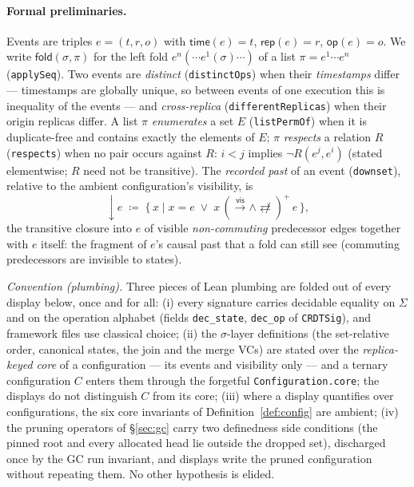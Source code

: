 \documentclass[11pt]{article}
\newcommand{\vis}{\xrightarrow{\mathsf{vis}}}
\newcommand{\ncomm}{\not\rightleftarrows}
\newcommand{\dow}[1]{{\downarrow}#1}
\newcommand{\lean}[1]{\texttt{#1}}
\newcommand{\fold}{\mathsf{fold}}
\begin{document}
\paragraph{Formal preliminaries.} Events are triples $e = (t,r,o)$ with
$\mathsf{time}(e) = t$, $\mathsf{rep}(e) = r$, $\mathsf{op}(e) = o$. We
write $\fold(\sigma, \pi)$ for the left fold
$e^n(\cdots e^1(\sigma)\cdots)$ of a list $\pi = e^1 \cdots e^n$
(\lean{applySeq}). Two events are \emph{distinct}
(\lean{distinctOps}) when their \emph{timestamps} differ --- timestamps
are globally unique, so between events of one execution this is
inequality of the events --- and \emph{cross-replica}
(\lean{differentReplicas}) when their origin replicas differ. A list
$\pi$ \emph{enumerates} a set $E$ (\lean{listPermOf}) when it is
duplicate-free and contains exactly the elements of $E$; $\pi$
\emph{respects} a relation $R$ (\lean{respects}) when no pair occurs
against $R$: $i < j$ implies $\neg R(e^j, e^i)$ (stated elementwise;
$R$ need not be transitive). The \emph{recorded past} of an event
(\lean{downset}), relative to the ambient configuration's visibility,
is
\[
  \dow{e} \;\coloneqq\;
  \{\, x \mid x = e \;\vee\; x \,({\vis} \wedge {\ncomm})^{+}\, e \,\},
\]
the transitive closure into $e$ of visible \emph{non-commuting}
predecessor edges together with $e$ itself: the fragment of $e$'s causal
past that a fold can still see (commuting predecessors are invisible to
states).

\emph{Convention (plumbing).} Three pieces of Lean plumbing are folded
out of every display below, once and for all: (i) every signature
carries decidable equality on $\Sigma$ and on the operation alphabet
(fields \lean{dec\_state}, \lean{dec\_op} of \lean{CRDTSig}), and
framework files use classical choice; (ii) the $\sigma$-layer
definitions (the set-relative order, canonical states, the join and the
merge VCs) are stated over the \emph{replica-keyed core} of a
configuration --- its events and visibility only --- and a ternary
configuration $C$ enters them through the forgetful
\lean{Configuration.core}; the displays do not distinguish $C$ from its
core; (iii) where a display quantifies over configurations, the six core
invariants of Definition~\ref{def:config} are ambient; (iv) the pruning
operators of \S\ref{sec:gc} carry two definedness side conditions (the
pinned root and every allocated head lie outside the dropped set),
discharged once by the GC run invariant, and displays write the pruned
configuration without repeating them. No other
hypothesis is elided.
\end{document}
